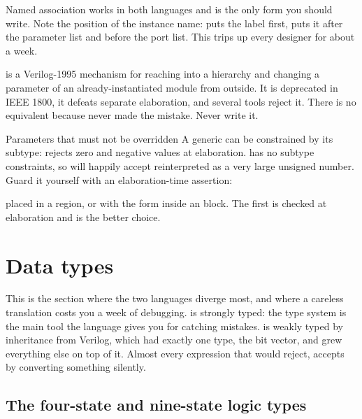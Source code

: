 Named association works in both languages and is the only form you should
write. Note the position of the instance name: \VHDL{} puts the label first,
\SV{} puts it after the parameter list and before the port list. This trips up
every \VHDL{} designer for about a week.

 is a Verilog-1995 mechanism for reaching into a
hierarchy and changing a parameter of an already-instantiated module from
outside. It is deprecated in IEEE 1800, it defeats separate elaboration, and
several tools reject it. There is no \VHDL{} equivalent because \VHDL{} never
made the mistake. Never write it.

\begin{notebox}{Parameters that must not be overridden}
A \VHDL{} generic can be constrained by its subtype: 
rejects zero and negative values at elaboration. \SV{} has no subtype
constraints, so  will happily accept
 reinterpreted as a very large unsigned number. Guard it yourself with
an elaboration-time assertion:
placed in a  region, or with the  form inside an
 block. The first is checked at elaboration and is the better
choice.
\end{notebox}

\section{Data types}
\label{sec:rosetta:types}

This is the section where the two languages diverge most, and where a careless
translation costs you a week of debugging. \VHDL{} is strongly typed: the type
system is the main tool the language gives you for catching mistakes. \SV{} is
weakly typed by inheritance from Verilog, which had exactly one type, the bit
vector, and grew everything else on top of it. Almost every expression that
\VHDL{} would reject, \SV{} accepts by converting something silently.

\subsection{The four-state and nine-state logic types}

